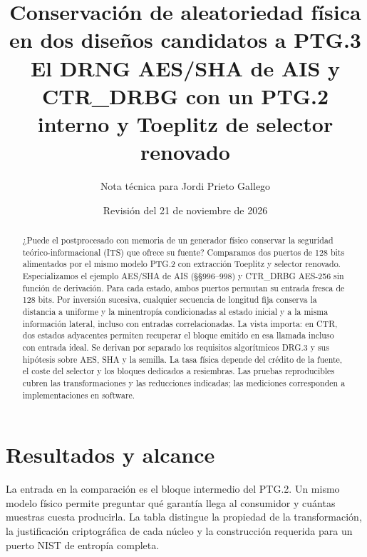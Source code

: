 \documentclass[11pt,a4paper]{article}
\title{Conservación de aleatoriedad física en dos diseños candidatos a PTG.3\\
\large El DRNG AES/SHA de AIS y CTR\_DRBG con un PTG.2 interno y Toeplitz de selector renovado}
\author{Nota técnica para Jordi Prieto Gallego}
\date{Revisión del 21 de noviembre de 2026}
\begin{document}
\maketitle
\begin{abstract}
¿Puede el postprocesado con memoria de un generador físico conservar la seguridad
teórico-informacional (ITS) que ofrece su fuente? Comparamos dos puertos de 128 bits
alimentados por el mismo modelo PTG.2 con extracción Toeplitz y selector renovado.
Especializamos el ejemplo AES/SHA de AIS (§§996--998) y CTR\_DRBG AES-256 sin función de
derivación. Para cada estado, ambos puertos permutan su entrada fresca de 128 bits.
Por inversión sucesiva, cualquier secuencia de longitud fija conserva la distancia
a uniforme y la minentropía condicionadas al estado inicial y a la misma información
lateral, incluso con entradas correlacionadas. La vista importa: en CTR, dos estados
adyacentes permiten recuperar el bloque emitido en esa llamada incluso con entrada ideal.
Se derivan por separado los requisitos algorítmicos DRG.3 y sus hipótesis sobre AES,
SHA y la semilla. La tasa física depende del crédito de la fuente, el coste del selector
y los bloques dedicados a resiembras. Las pruebas reproducibles cubren las transformaciones
y las reducciones indicadas; las mediciones corresponden a implementaciones en software.
\end{abstract}

\section{Resultados y alcance}
\label{sec:status}
La entrada en la comparación es el bloque intermedio del PTG.2. Un mismo modelo
físico permite preguntar qué garantía llega al consumidor y cuántas muestras
cuesta producirla. La tabla distingue la propiedad de la transformación, la
justificación criptográfica de cada núcleo y la construcción requerida para un
puerto NIST de entropía completa.
\end{document}
